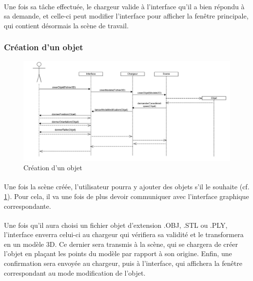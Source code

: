 \paragraph{}
Une fois sa tâche effectuée, le chargeur valide à l’interface qu’il a bien répondu à sa demande, et celle-ci peut modifier l’interface pour afficher la fenêtre principale, qui contient désormais la scène de travail.

\subsubsection{Création d'un objet}

\begin{figure}[h]
		\centering
		\includegraphics[scale=0.4]{creerobjet.jpg}
		\caption{\label{fig:creerObjet} Création d'un objet}
\end{figure}

\paragraph{}
Une fois la scène créée, l'utilisateur pourra y ajouter des objets s'il le souhaite (cf. \ref{fig:creerObjet}). Pour cela, il va une fois de plus devoir communiquer avec l'interface graphique correspondante.

\paragraph{}
Une fois qu'il aura choisi un fichier objet d'extension .OBJ, .STL ou .PLY, l'interface enverra celui-ci au chargeur qui vérifiera sa validité et le transformera en un modèle 3D. Ce dernier sera transmis à la scène, qui se chargera de créer l'objet en plaçant les points du modèle par rapport à son origine. Enfin, une confirmation sera envoyée au chargeur, puis à l'interface, qui affichera la fenêtre correspondant au mode modification de l'objet.

